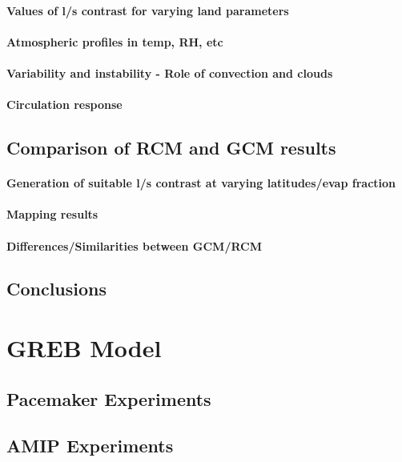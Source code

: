 \paragraph{Values of l/s contrast for varying land parameters}
\paragraph{Atmospheric profiles in temp, RH, etc}
\paragraph{Variability and instability - Role of convection and clouds}
\paragraph{Circulation response}


\subsection{Comparison of RCM and GCM results}

\paragraph{Generation of suitable l/s contrast at varying latitudes/evap 
fraction}
\paragraph{Mapping results}
\paragraph{Differences/Similarities between GCM/RCM}


\subsection{Conclusions}


\section{GREB Model}

\subsection{Pacemaker Experiments}


\subsection{AMIP Experiments}
